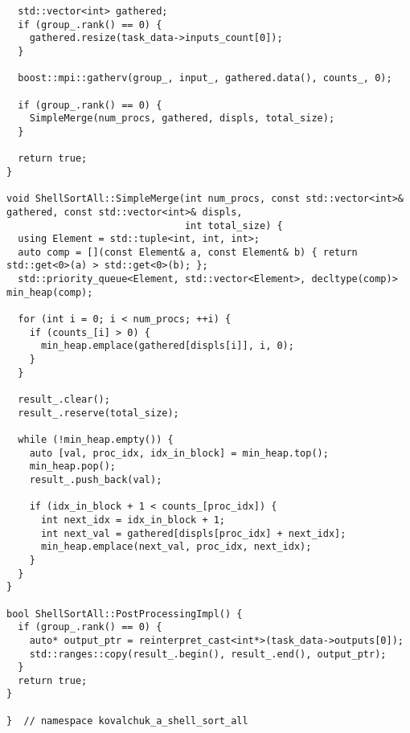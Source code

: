 \documentclass[a4paper,12pt]{article}
\begin{document}
\begin{lstlisting}
  std::vector<int> gathered;
  if (group_.rank() == 0) {
    gathered.resize(task_data->inputs_count[0]);
  }

  boost::mpi::gatherv(group_, input_, gathered.data(), counts_, 0);

  if (group_.rank() == 0) {
    SimpleMerge(num_procs, gathered, displs, total_size);
  }

  return true;
}

void ShellSortAll::SimpleMerge(int num_procs, const std::vector<int>& gathered, const std::vector<int>& displs,
                               int total_size) {
  using Element = std::tuple<int, int, int>;
  auto comp = [](const Element& a, const Element& b) { return std::get<0>(a) > std::get<0>(b); };
  std::priority_queue<Element, std::vector<Element>, decltype(comp)> min_heap(comp);

  for (int i = 0; i < num_procs; ++i) {
    if (counts_[i] > 0) {
      min_heap.emplace(gathered[displs[i]], i, 0);
    }
  }

  result_.clear();
  result_.reserve(total_size);

  while (!min_heap.empty()) {
    auto [val, proc_idx, idx_in_block] = min_heap.top();
    min_heap.pop();
    result_.push_back(val);

    if (idx_in_block + 1 < counts_[proc_idx]) {
      int next_idx = idx_in_block + 1;
      int next_val = gathered[displs[proc_idx] + next_idx];
      min_heap.emplace(next_val, proc_idx, next_idx);
    }
  }
}

bool ShellSortAll::PostProcessingImpl() {
  if (group_.rank() == 0) {
    auto* output_ptr = reinterpret_cast<int*>(task_data->outputs[0]);
    std::ranges::copy(result_.begin(), result_.end(), output_ptr);
  }
  return true;
}

}  // namespace kovalchuk_a_shell_sort_all
\end{lstlisting}
\end{document}
